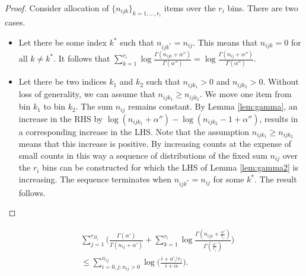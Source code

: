 \documentclass[letterpaper]{article}
\newenvironment{customthm}[1]
  {\renewcommand\theinnercustomthm{#1}\innercustomthm}
  {\endinnercustomthm}
\begin{document}
\begin{proof}
Consider allocation of $\{n_{ijk}\}_{k=1,...,{r_{i}}}$  items over the $r_i$ bins. There are two cases.
\begin{itemize}
    \item Let there be some index $k^\ast$ such that $n_{ijk^{\ast}} = n_{ij}$. This means that $n_{ijk}=0$ for all $k\neq k^\ast$. It follows that $\sum_{k=1}^{r_i} \log \frac{\Gamma(n_{ijk} + \alpha'')}{\Gamma(\alpha'')} = \log \frac{\Gamma(n_{ij} + \alpha'')}{\Gamma(\alpha'')}$.
    \item Let there be two indices $k_1$ and $k_2$ such that $n_{ijk_{1}} > 0$ and $n_{ijk_{2}} > 0$. Without loss of generality, we can assume that $n_{ijk_{1}} \geq n_{ijk_{2}}$. We move one item from bin $k_1$ to bin $k_2$. The sum $n_{ij}$ remains constant. By Lemma \ref{lem:gamma}, an increase in the RHS by $\log (n_{ijk_{1}}  + \alpha'') - \log (n_{ijk_{2}}  -1+ \alpha'')$, results in a corresponding increase in the LHS. Note that the assumption $n_{ijk_{1}} \geq n_{ijk_{2}}$ means that this increase is positive. 
     By increasing counts at the expense of small counts in  this way a sequence of distributions of the fixed sum $n_{ij}$ over the $r_i$ bins can be constructed for which the LHS of Lemma \ref{lem:gamma2} is increasing. The sequence terminates when $n_{ijk^{\ast}} = n_{ij}$ for some $k^\ast$. The result follows.
\end{itemize} 

\end{proof}

\begin{customthm}{6C}
\cite{cussens2015gobnilp}
\begin{align*}
     &\sum_{j=1}^{r_{\Pi_i}} \Bigg( \frac{\Gamma( \alpha')}{\Gamma(n_{ij}+\alpha')} +  \sum_{k=1}^{r_i} \log \frac{\Gamma(n_{ijk} + \frac{\alpha'}{r_i})}{\Gamma( \frac{\alpha'}{r_i})}\Bigg) \\ 
     &\leq  \sum_{i=0, j:n_{ij}>0}^{n_{ij}} \log \Big( \frac{i+ a'/r_i}{i+\alpha}\Big).
\end{align*} \label{thm:gamma4}
\end{customthm}
\end{document}
